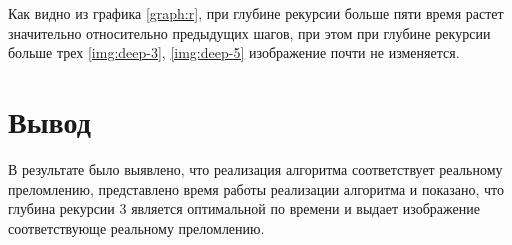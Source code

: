 Как видно из графика \ref{graph:r}, при глубине рекурсии больше пяти время растет значительно относительно предыдущих шагов, при этом при глубине рекурсии больше трех \ref{img:deep-3}, \ref{img:deep-5} изображение почти не изменяется. 

\section*{Вывод}

В результате было выявлено, что реализация алгоритма соответствует реальному преломлению, представлено время работы реализации алгоритма и показано, что глубина рекурсии 3 является оптимальной по времени и выдает изображение соответствующе реальному преломлению.